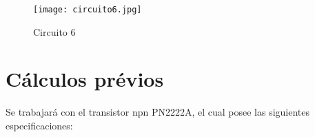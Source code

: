 \documentclass[10pt, a4paper]{article}
\begin{document}
    \begin{figure}[h!]
        \centering
        \texttt{[image: circuito6.jpg]}
        \caption{\label{fig:12} Circuito 6}
    \end{figure}

    \newpage

    \section{Cálculos prévios}

    Se trabajará con el transistor npn PN2222A, el cual posee las siguientes especificaciones:

    
\end{document}
